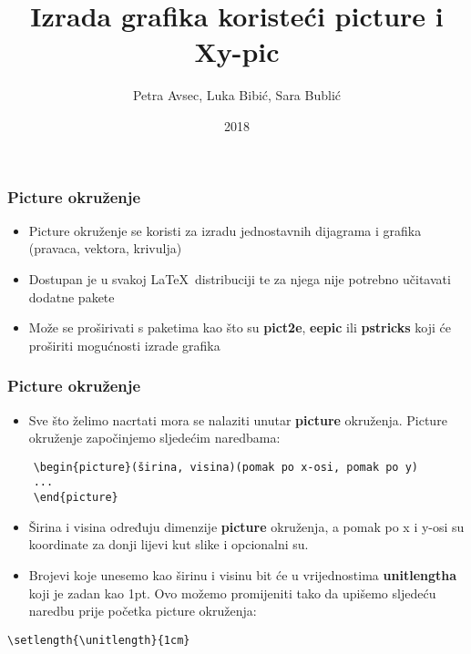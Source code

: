 \documentclass[9pt]{beamer}
\title{Izrada grafika koristeći picture i Xy-pic}
\author{Petra Avsec, Luka Bibić, Sara Bublić}
\date{2018}
\begin{document}
	\frame{\titlepage}

\begin{frame}
	\frametitle{Picture okruženje}

	\begin{itemize}
		\item Picture okruženje se koristi za izradu jednostavnih dijagrama i grafika (pravaca, vektora, krivulja)
		\item Dostupan je u svakoj \LaTeX\ distribuciji te za njega nije potrebno učitavati dodatne pakete
		\item Može se proširivati s paketima kao što su \textbf{pict2e}, \textbf{eepic} ili \textbf{pstricks} koji će proširiti mogućnosti izrade grafika
	\end{itemize}	

\end{frame}

\begin{frame}[fragile]
	\frametitle{Picture okruženje}

	\begin{itemize}
		\item Sve što želimo nacrtati mora se nalaziti unutar \textbf{picture} okruženja. Picture okruženje započinjemo sljedećim naredbama:
	\end{itemize}

	
	\begin{verbatim}
	\begin{picture}(širina, visina)(pomak po x-osi, pomak po y) 
	...
	\end{picture}
	\end{verbatim}

	\begin{itemize}
	\item Širina i visina određuju dimenzije \textbf{picture} okruženja, a pomak po x i y-osi su koordinate za donji lijevi kut slike i opcionalni su. 
	\item Brojevi koje unesemo kao širinu i visinu bit će u vrijednostima \textbf{unitlengtha} koji je zadan kao 1pt. Ovo možemo promijeniti tako da upišemo sljedeću naredbu prije početka picture okruženja:
	\end{itemize}	

	\begin{verbatim}\setlength{\unitlength}{1cm}\end{verbatim}

\end{frame}
\end{document}
